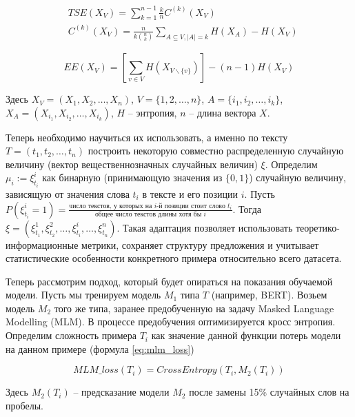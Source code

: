 \documentclass{spbau-diploma}
\begin{document}
\begin{equation} \label{eq:tse}
\begin{split}
	& TSE(X_V) = \sum\limits_{k=1}^{n-1}\frac{k}{n}C^{(k)}(X_V) \\
	& C^{(k)}(X_V) = \frac{n}{k\binom{n}{k}}\sum\limits_{A\subseteq V,|A|=k}H(X_A) - H(X_V)
\end{split}
\end{equation}

\begin{equation} \label{eq:ee}
EE(X_V) = \left[\sum\limits_{v\in V}H(X_{V\backslash\{v\}})\right] - (n - 1)H(X_V)
\end{equation}

Здесь $X_V = \left(X_1,X_2,\ldots,X_n\right)$, $V = \{1,2,\ldots,n\}$, $A=\{i_1,i_2,\ldots,i_k\}$, $X_A = \left(X_{i_1},X_{i_2},\ldots,X_{i_k}\right)$, $H$ -- энтропия, $n$ -- длина вектора $X$.

Теперь необходимо научиться их использовать, а именно по тексту $T=(t_1,t_2,\ldots,t_n)$ построить некоторую совместно распределенную случайную величину (вектор вещественнозначных случайных величин) $\xi$. Определим $\mu_i := \xi_{t_i}^{i}$ как бинарную (принимающую значения из $\{0, 1\}$) случайную величину, зависящую от значения слова $t_i$ в тексте и его позиции $i$. Пусть $P(\xi_{t_i}^i = 1) = \frac{\text{число текстов, у которых на } i \text{-й позиции стоит слово } t_i}{\text{общее число текстов длины хотя бы }i}$. Тогда $\xi = (\xi_{t_1}^1,\xi_{t_2}^2,\ldots,\xi_{t_i}^i,\ldots,\xi_{t_n}^n)$. Такая адаптация позволяет использовать теоретико-информационные метрики, сохраняет структуру предложения и учитывает статистические особенности конкретного примера относительно всего датасета.

Теперь рассмотрим подход, который будет опираться на показания обучаемой модели. Пусть мы тренируем модель $M_1$ типа $T$ (например, BERT). Возьем модель $M_2$ того же типа, заранее предобученную на задачу Masked Language Modelling (MLM). В процессе предобучения оптимизируется кросс энтропия. Определим сложность примера $T_i$ как значение данной функции потерь модели на данном примере (формула \ref{eq:mlm_loss})

\begin{equation} \label{eq:mlm_loss}
MLM\_loss(T_i) = CrossEntropy(T_i, M_2(T_i))
\end{equation}

Здесь $M_2(T_i)$ -- предсказание модели $M_2$ после замены 15\% случайных слов на пробелы.
\end{document}
